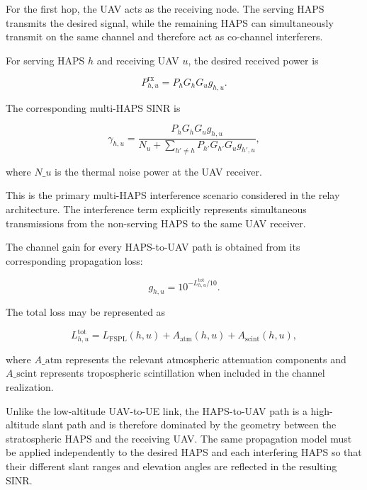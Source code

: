 \documentclass[conference]{IEEEtran}
\begin{document}
For the first hop, the UAV acts as the receiving node. The serving HAPS transmits the desired signal, while the remaining HAPS can simultaneously transmit on the same channel and therefore act as co-channel interferers.

For serving HAPS $h$ and receiving UAV $u$, the desired received power is

\begin{equation}
P_{h,u}^{\mathrm{rx}}= P_hG_hG_u g_{h,u}.
\end{equation}

The corresponding multi-HAPS SINR is

\begin{equation}
\gamma_{h,u}=\frac{P_hG_hG_u g_{h,u}}{N_u + \displaystyle\sum_{h'\neq h}P_{h'}G_{h'}G_u g_{h',u}},
\label{eq:haps-uav-sinr}
\end{equation}

where $N\_u$ is the thermal noise power at the UAV receiver.

This is the primary multi-HAPS interference scenario considered in the relay architecture. The interference term explicitly represents simultaneous transmissions from the non-serving HAPS to the same UAV receiver.

The channel gain for every HAPS-to-UAV path is obtained from its corresponding propagation loss:

\begin{equation}
g_{h,u}= 10^{-L_{h,u}^{\mathrm{tot}}/10}.
\end{equation}

The total loss may be represented as

\begin{equation}
L_{h,u}^{\mathrm{tot}}=L_{\mathrm{FSPL}}(h,u)+ A_{\mathrm{atm}}(h,u)+ A_{\mathrm{scint}}(h,u),
\end{equation}

where $A\_{\mathrm{atm}}$ represents the relevant atmospheric attenuation components and $A\_{\mathrm{scint}}$ represents tropospheric scintillation when included in the channel realization.

Unlike the low-altitude UAV-to-UE link, the HAPS-to-UAV path is a high-altitude slant path and is therefore dominated by the geometry between the stratospheric HAPS and the receiving UAV. The same propagation model must be applied independently to the desired HAPS and each interfering HAPS so that their different slant ranges and elevation angles are reflected in the resulting SINR.
\end{document}
